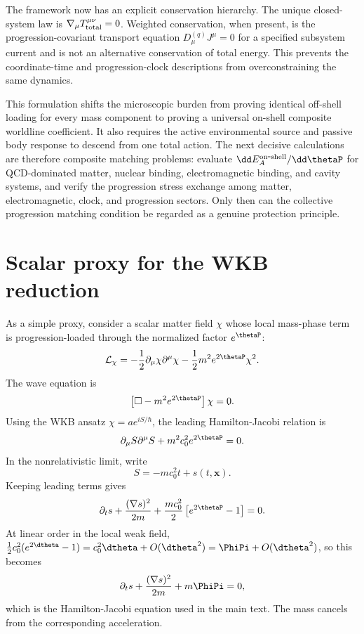 \documentclass[12pt]{article}
\begin{document}
The framework now has an explicit conservation hierarchy.  The unique closed-system law is \(\nabla_\mu T_{\rm total}^{\mu\nu}=0\).  Weighted conservation, when present, is the progression-covariant transport equation \(D_\mu^{(q)}J^\mu=0\) for a specified subsystem current and is not an alternative conservation of total energy.  This prevents the coordinate-time and progression-clock descriptions from overconstraining the same dynamics.

This formulation shifts the microscopic burden from proving identical off-shell loading for every mass component to proving a universal on-shell composite worldline coefficient.  It also requires the active environmental source and passive body response to descend from one total action.  The next decisive calculations are therefore composite matching problems: evaluate \(\dd E_A^{\rm on\mbox{-}shell}/\dd\thetaP\) for QCD-dominated matter, nuclear binding, electromagnetic binding, and cavity systems, and verify the progression stress exchange among matter, electromagnetic, clock, and progression sectors.  Only then can the collective progression matching condition be regarded as a genuine protection principle.
\appendix

\section{Scalar proxy for the WKB reduction}

As a simple proxy, consider a scalar matter field \(\chi\) whose local mass-phase term is progression-loaded through the normalized factor \(e^{\thetaP}\):
\begin{equation}
    \mathcal{L}_\chi
    =-\frac{1}{2}\partial_\mu\chi\partial^\mu\chi
    -\frac{1}{2}m^2e^{2\thetaP}\chi^2.
    \label{eq:scalar-proxy}
\end{equation}
The wave equation is
\begin{equation}
    \left[\Box-m^2e^{2\thetaP}\right]\chi=0.
    \label{eq:scalar-wave}
\end{equation}
Using the WKB ansatz \(\chi=a e^{iS/\hbar}\), the leading Hamilton-Jacobi relation is
\begin{equation}
    \partial_\mu S\partial^\mu S + m^2c_0^2 e^{2\thetaP}=0.
    \label{eq:relativistic-HJ}
\end{equation}
In the nonrelativistic limit, write
\begin{equation}
    S=-mc_0^2 t+s(t,\bm x).
    \label{eq:S-nonrel}
\end{equation}
Keeping leading terms gives
\begin{equation}
    \partial_t s+\frac{(\nabla s)^2}{2m}+\frac{mc_0^2}{2}\left[e^{2\thetaP}-1\right]=0.
    \label{eq:scalar-nonrel-HJ}
\end{equation}
At linear order in the local weak field, \(\tfrac12c_0^2(e^{2\dtheta}-1)=c_0^2\dtheta+O(\dtheta^2)=\PhiPi+O(\dtheta^2)\), so this becomes
\begin{equation}
    \partial_t s+\frac{(\nabla s)^2}{2m}+m\PhiPi=0,
    \label{eq:scalar-HJ-Phi}
\end{equation}
which is the Hamilton-Jacobi equation used in the main text. The mass cancels from the corresponding acceleration.
\end{document}

